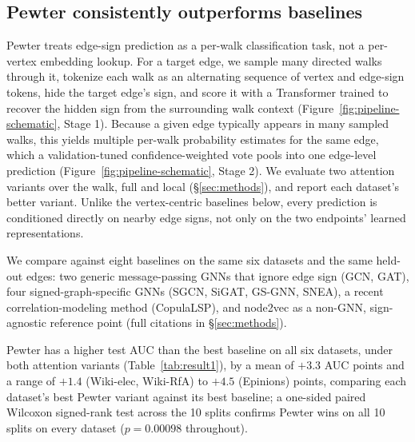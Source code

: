 \documentclass[sigconf, review, anonymous]{acmart}
\theoremstyle{plain}
\theoremstyle{definition}
\begin{document}
\subsection{Pewter consistently outperforms baselines}

Pewter treats edge-sign prediction as a per-walk classification task, not a per-vertex embedding lookup. For a target edge, we sample many directed walks through it, tokenize each walk as an alternating sequence of vertex and edge-sign tokens, hide the target edge's sign, and score it with a Transformer trained to recover the hidden sign from the surrounding walk context (Figure~\ref{fig:pipeline-schematic}, Stage 1). Because a given edge typically appears in many sampled walks, this yields multiple per-walk probability estimates for the same edge, which a validation-tuned confidence-weighted vote pools into one edge-level prediction (Figure~\ref{fig:pipeline-schematic}, Stage 2). We evaluate two attention variants over the walk, full and local (\S\ref{sec:methods}), and report each dataset's better variant. Unlike the vertex-centric baselines below, every prediction is conditioned directly on nearby edge signs, not only on the two endpoints' learned representations.

We compare against eight baselines on the same six datasets and the same held-out edges: two generic message-passing GNNs that ignore edge sign (GCN, GAT), four signed-graph-specific GNNs (SGCN, SiGAT, GS-GNN, SNEA), a recent correlation-modeling method (CopulaLSP), and node2vec as a non-GNN, sign-agnostic reference point (full citations in \S\ref{sec:methods}).

Pewter has a higher test AUC than the best baseline on all six datasets, under both attention variants (Table~\ref{tab:result1}), by a mean of $+3.3$ AUC points and a range of $+1.4$ (Wiki-elec, Wiki-RfA) to $+4.5$ (Epinions) points, comparing each dataset's best Pewter variant against its best baseline; a one-sided paired Wilcoxon signed-rank test across the 10 splits confirms Pewter wins on all 10 splits on every dataset ($p=0.00098$ throughout).
\end{document}
